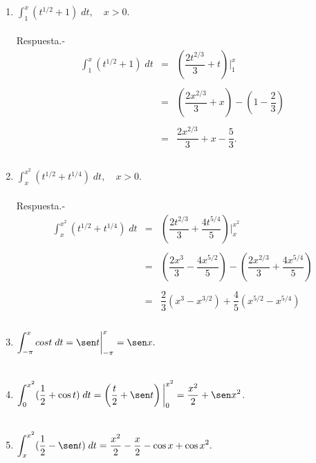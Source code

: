 \begin{enumerate}[\bfseries  1.]
    \item $\displaystyle\int_1^x (t^{1/2}+1)\; dt, \quad x>0.$\\\\
	Respuesta.-\; 
	$$\begin{array}{rcl}
	    \displaystyle\int_1^x (t^{1/2}+1)\; dt&=&\left(\dfrac{2t^{2/3}}{3}+t\right)\bigg|_1^x\\\\
						  &=&\left(\dfrac{2x^{2/3}}{3}+x\right)-\left(1-\dfrac{2}{3}\right)\\\\
						  &=&\dfrac{2x^{2/3}}{3}+x-\dfrac{5}{3}.\\\\
						  
	\end{array}$$

    \item $\displaystyle\int_x^{x^2} (t^{1/2} + t^{1/4})\; dt, \quad x>0$.\\\\
	Respuesta.-\;
	$$\begin{array}{rcl}
	    \displaystyle\int_x^{x^2} (t^{1/2} + t^{1/4})\; dt&=&\left(\dfrac{2t^{2/3}}{3}+\dfrac{4t^{5/4}}{5}\right)\bigg|_x^{x^2}\\\\
							      &=&\left(\dfrac{2x^3}{3}-\dfrac{4x^{5/2}}{5}\right)-\left(\dfrac{2x^{2/3}}{3}+\dfrac{4x^{5/4}}{5}\right)\\\\
							      &=&\dfrac{2}{3}(x^3-x^{3/2})+\dfrac{4}{5}(x^{5/2}-x^{5/4})\\\\
	\end{array}$$

    \item $\displaystyle\int_{-\pi}^{x} cos t\; dt = \sen t \bigg|_{-\pi}^x = \sen x.$\\\\

    \item $\displaystyle\int_0^{x^2} (\frac{1}{2}+\cos t)\; dt = \left(\dfrac{t}{2}+\sen t\right)\bigg|_0^{x^2} = \dfrac{x^2}{2}+\sen x^2$.\\\\

    \item $\displaystyle\int_x^{x^2}(\frac{1}{2}-\sen t)\; dt = \dfrac{x^2}{2}-\dfrac{x}{2}-\cos x + \cos x^2.$\\\\
   

\end{enumerate}
